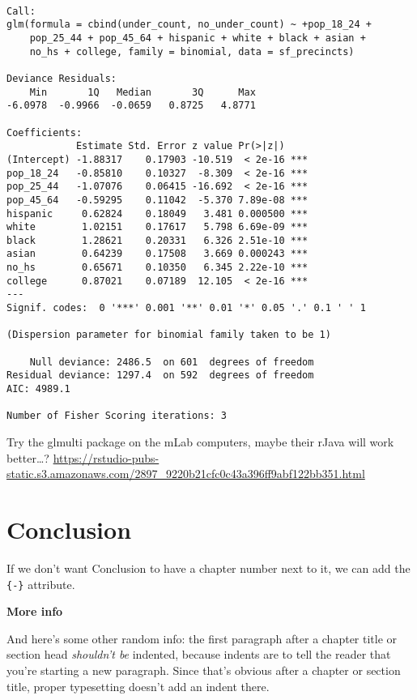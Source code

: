 \documentclass[12pt,twoside]{reedthesis}
\theoremstyle{definition}
\theoremstyle{definition}
\theoremstyle{definition}
\theoremstyle{remark}
\begin{document}
\begin{verbatim}

Call:
glm(formula = cbind(under_count, no_under_count) ~ +pop_18_24 + 
    pop_25_44 + pop_45_64 + hispanic + white + black + asian + 
    no_hs + college, family = binomial, data = sf_precincts)

Deviance Residuals: 
    Min       1Q   Median       3Q      Max  
-6.0978  -0.9966  -0.0659   0.8725   4.8771  

Coefficients:
            Estimate Std. Error z value Pr(>|z|)    
(Intercept) -1.88317    0.17903 -10.519  < 2e-16 ***
pop_18_24   -0.85810    0.10327  -8.309  < 2e-16 ***
pop_25_44   -1.07076    0.06415 -16.692  < 2e-16 ***
pop_45_64   -0.59295    0.11042  -5.370 7.89e-08 ***
hispanic     0.62824    0.18049   3.481 0.000500 ***
white        1.02151    0.17617   5.798 6.69e-09 ***
black        1.28621    0.20331   6.326 2.51e-10 ***
asian        0.64239    0.17508   3.669 0.000243 ***
no_hs        0.65671    0.10350   6.345 2.22e-10 ***
college      0.87021    0.07189  12.105  < 2e-16 ***
---
Signif. codes:  0 '***' 0.001 '**' 0.01 '*' 0.05 '.' 0.1 ' ' 1

(Dispersion parameter for binomial family taken to be 1)

    Null deviance: 2486.5  on 601  degrees of freedom
Residual deviance: 1297.4  on 592  degrees of freedom
AIC: 4989.1

Number of Fisher Scoring iterations: 3
\end{verbatim}
Try the glmulti package on the mLab computers, maybe their rJava will
work better\ldots{}?
\url{https://rstudio-pubs-static.s3.amazonaws.com/2897_9220b21cfc0c43a396ff9abf122bb351.html}

\hypertarget{conclusion}{%
\chapter*{Conclusion}\label{conclusion}}

If we don't want Conclusion to have a chapter number next to it, we can
add the \texttt{\{-\}} attribute.

\textbf{More info}

And here's some other random info: the first paragraph after a chapter
title or section head \emph{shouldn't be} indented, because indents are
to tell the reader that you're starting a new paragraph. Since that's
obvious after a chapter or section title, proper typesetting doesn't add
an indent there.
\end{document}
